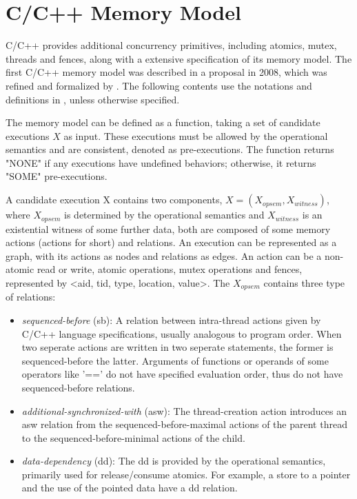 \section{C/C++ Memory Model}
C/C++ provides additional concurrency primitives, including atomics, mutex, threads and fences, along with a extensive specification of its memory model.
The first C/C++ memory model was described in a proposal\cite{c++model-proposal} in 2008, which was refined and formalized by \cite{c++model}. The following contents use the notations and definitions in \cite{c++model}, unless otherwise specified.

The memory model can be defined as a function, taking a set of candidate executions $X$ as input. These executions must be allowed by the operational semantics and are consistent, denoted as pre-executions. The function returns "NONE" if any executions have undefined behaviors; otherwise, it returns "SOME" pre-executions.

A candidate execution X contains two components, $X = (X_{opsem}, X_{witness})$, where $X_{opsem}$ is determined by the operational semantics and $X_{witness}$ is an existential witness of some further data, both are composed of some memory actions (actions for short) and relations. An execution can be represented as a graph, with its actions as nodes and relations as edges. An action can be a non-atomic read or write, atomic operations, mutex operations and fences, represented by <aid, tid, type, location, value>. The $X_{opsem}$ contains three type of relations:

\begin{itemize}
	\item \textit{sequenced-before} (sb): A relation between intra-thread actions given by C/C++ language specifications, usually analogous to program order. When two seperate actions are written in two seperate statements, the former is sequenced-before the latter. Arguments of functions or operands of some operators like '==' do not have specified evaluation order, thus do not have sequenced-before relations.
	\item \textit{additional-synchronized-with} (asw): The thread-creation action introduces an asw relation from the sequenced-before-maximal actions of the parent thread to the sequenced-before-minimal actions of the child.
	\item \textit{data-dependency} (dd):  The dd is provided by the operational semantics, primarily used for release/consume atomics. For example, a store to a pointer and the use of the pointed data have a dd relation.
\end{itemize}

